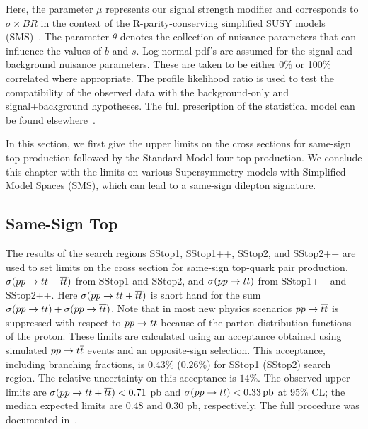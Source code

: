 Here, the parameter $\mu$ represents our signal strength modifier and
corresponds to $\sigma \times BR$ in the context of the R-parity-conserving
simplified SUSY models (SMS)~\cite{sms}. The parameter $\theta$ denotes the
collection of nuisance parameters that can influence the values of $b$ and
$s$. Log-normal pdf's are assumed for the signal and background nuisance
parameters. These are taken to be either 0\% or 100\% correlated where
appropriate. The profile likelihood ratio is used to test the compatibility
of the observed data with the background-only and signal+background
hypotheses. The full prescription of the statistical model can be found
elsewhere~\cite{Read:2002hq,ATL-PHYS-PUB-2011-011,Junk:1999kv}.

In this section, we first give the upper limits on the cross sections for
same-sign top production followed by the Standard Model four top production.
We conclude this chapter with the limits on various Supersymmetry models
with Simplified Model Spaces (SMS), which can lead to a same-sign dilepton
signature.

\subsection{Same-Sign Top}
\label {sec:results_int_sstop}
The results of the search regions SStop1, SStop1++, SStop2, and SStop2++
are used to set limits on the cross section for same-sign top-quark pair
production, $\sigma(\relax{p} \relax{p} \to \relax{t} \relax{t} + \overline{\relax{t}} \overline{\relax{t}})$ from SStop1 and
SStop2, and $\sigma(\relax{p} \relax{p} \to \relax{t} \relax{t})$ from SStop1++ and SStop2++.
Here $\sigma(\relax{p} \relax{p} \to \relax{t} \relax{t} + \overline{\relax{t}} \overline{\relax{t}})$ is short hand for the
sum $\sigma(\relax{p} \relax{p} \to \relax{t} \relax{t})+\sigma(\relax{p} \relax{p} \to \overline{\relax{t}} \overline{\relax{t}})$. Note
that in most new physics scenarios $\relax{p} \relax{p} \to \overline{\relax{t}} \overline{\relax{t}}$ is suppressed
with respect to $\relax{p} \relax{p} \to \relax{t} \relax{t}$ because of the parton distribution
functions of the proton. These limits are calculated using an acceptance
obtained using simulated $\relax{p} \relax{p} \to \relax{t} \overline{\relax{t}}$ events and an opposite-sign
selection. This acceptance, including branching fractions, is $0.43\%$
($0.26\%$) for SStop1 (SStop2) search region. The relative uncertainty on
this acceptance is $14\%$. The observed upper limits are $\sigma(\relax{p} \relax{p} \to
\relax{t} \relax{t} + \overline{\relax{t}} \overline{\relax{t}}) < 0.71$ pb and $\sigma(\relax{p} \relax{p} \to \relax{t} \relax{t})
< 0.33\text{\,pb}$ at 95\% CL; the median expected limits are 0.48 and 0.30
\unit{pb}, respectively.  The full procedure was documented in~\cite{an_ssb2012}.

